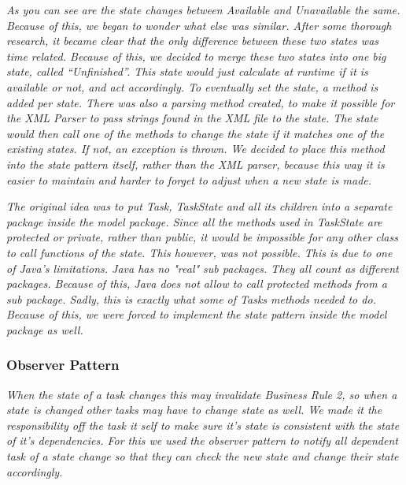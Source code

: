 				\emph{As you can see are the state changes between Available and Unavailable the same. Because of this, we began to wonder what else was similar. After some thorough research, it became clear that the only difference between these two states was time related. Because of this, we decided to merge these two states into one big state, called "`Unfinished"'. This state would just calculate at runtime if it is available or not, and act accordingly. To eventually set the state, a method is added per state. There was also a parsing method created, to make it possible for the XML Parser to pass strings found in the XML file to the state. The state would then call one of the methods to change the state if it matches one of the existing states. If not, an exception is thrown. We decided to place this method into the state pattern itself, rather than the XML parser, because this way it is easier to maintain and harder to forget to adjust when a new state is made.}
			
				\emph{The original idea was to put Task, TaskState and all its children into a separate package inside the model package. Since all the methods used in TaskState are protected or private, rather than public, it would be impossible for any other class to call functions of the state. This however, was not possible. This is due to one of Java's limitations. Java has no "real" sub packages. They all count as different packages. Because of this, Java does not allow to call protected methods from a sub package. Sadly, this is exactly what some of Tasks methods needed to do. Because of this, we were forced to implement the state pattern inside the model package as well.}
						
			\subsubsection{Observer Pattern}
				\emph{When the state of a task changes this may invalidate Business Rule 2, so when a state is changed other tasks may have to change state as well. We made it the responsibility off the task it self to make sure it's state is consistent with the state of it's dependencies. For this we used the observer pattern to notify all dependent task of a state change so that they can check the new state and change their state accordingly.}
				

